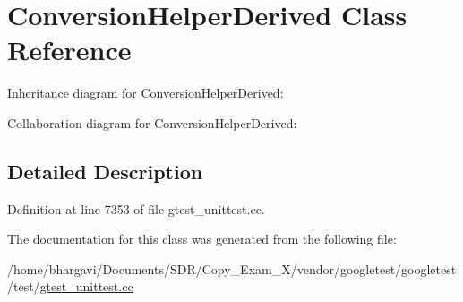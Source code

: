 \hypertarget{class_conversion_helper_derived}{}\section{Conversion\+Helper\+Derived Class Reference}
\label{class_conversion_helper_derived}


Inheritance diagram for Conversion\+Helper\+Derived\+:


Collaboration diagram for Conversion\+Helper\+Derived\+:


\subsection{Detailed Description}


Definition at line 7353 of file gtest\+\_\+unittest.\+cc.



The documentation for this class was generated from the following file\+:\begin{DoxyCompactItemize}
\item 
/home/bhargavi/\+Documents/\+S\+D\+R/\+Copy\+\_\+\+Exam\+\_\+X/vendor/googletest/googletest/test/\hyperlink{gtest__unittest_8cc}{gtest\+\_\+unittest.\+cc}\end{DoxyCompactItemize}
